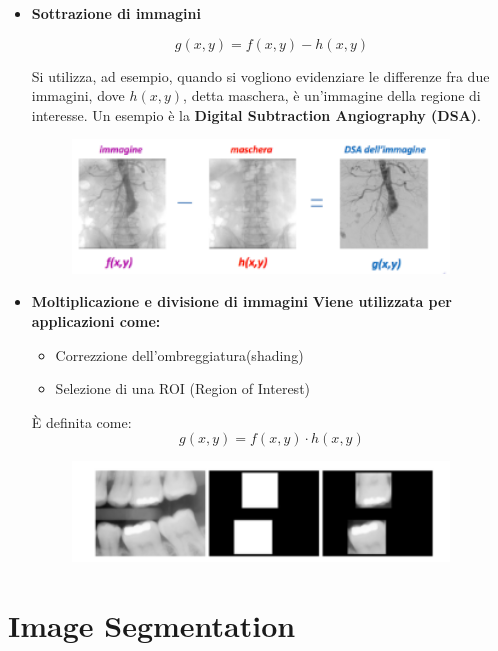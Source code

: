 \begin{itemize}
    \item \textbf{Sottrazione di immagini}

          $$
              g(x,y) = f(x,y)-h(x,y)
          $$

          Si utilizza, ad esempio, quando si vogliono evidenziare le differenze
          fra due immagini, dove $h(x,y)$, detta maschera, è un'immagine della
          regione di interesse. Un esempio è la \textbf{Digital Subtraction
              Angiography (DSA)}.
          \begin{figure}[H]
              \centering
              \includegraphics[width=10cm, keepaspectratio]{capitoli/immagini/imgs/sottrazione.png}
          \end{figure}

    \item \textbf{Moltiplicazione e divisione di immagini}
          \textbf{Viene utilizzata per applicazioni come:}
          \begin{itemize}
              \item Correzzione dell'ombreggiatura(shading)
              \item Selezione di una ROI (Region of Interest)
          \end{itemize}
          È definita come:
          $$
              g(x,y) = f(x,y) \cdot h(x,y)
          $$


          \begin{figure}[H]
              \centering
              \includegraphics[width=10cm, keepaspectratio]{capitoli/immagini/imgs/moltiplicazione.png}
          \end{figure}
\end{itemize}


\chapter{Image Segmentation}

